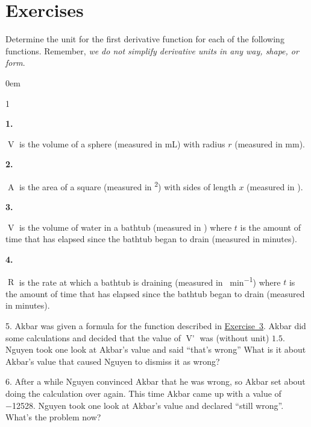 \documentclass[12pt,]{book}
\theoremstyle{plain}
\theoremstyle{definition}
\numberwithin{equation}{section}
\newenvironment{exercisegroup}%
{\medskip\noindent}%
{\par\bigskip}%
\newlength{\exercisegroupindent}%
\newlength{\exercisegroupitemwidth}%
\newenvironment{exercisegrouplist}%
{\vspace{-\partopsep}%
\begin{adjustwidth}{\exercisegroupindent}{0em}}%
{\end{adjustwidth}%
\vspace{-\partopsep}%
\vspace{\baselineskip}}%
\newenvironment{exercisegroupbycol}[1]%
{\begin{exercisegrouplist}%
\vspace{-\multicolsep}%
\begin{multicols}{#1}%
\setlength{\parindent}{0em}%
\setlength{\exercisegroupitemwidth}{\linewidth}}%
{\end{multicols}%
\vspace{-\multicolsep}%
\end{exercisegrouplist}}%
\newenvironment{exercisegroupitem}[1]%
{\begin{minipage}[t]{\exercisegroupitemwidth}
\vspace{0pt}%
{\bfseries#1}%
\rule{0pt}{\baselineskip}}{\strut%
\end{minipage}%
\hspace{\columnsep}}%
\providecommand\phantomsection{}
\newcommand{\fe}[2]{\mathop{{#1}{\left(#2\right)}}}
\newcommand{\fd}[1]{#1'}
\begin{document}
\section*{Exercises}\label{exercises-20}

\begin{exercisegroup}%
Determine the unit for the first derivative function for each of the following functions. Remember, \emph{we do not simplify derivative units in any way, shape, or form}.%
\begin{exercisegroupbycol}{1}%
\begin{exercisegroupitem}{1. }\phantomsection\hypertarget{exercise-137}{\null}
\(\fe{V}{r}\) is the volume of a sphere (measured in \si{\milli\liter}) with radius \(r\) (measured in \si{\milli\meter}).%
\end{exercisegroupitem}%
\par%
\begin{exercisegroupitem}{2. }\phantomsection\hypertarget{exercise-138}{\null}
\(\fe{A}{x}\) is the area of a square (measured in \si{\foot\tothe{2}}) with sides of length \(x\) (measured in \si{\foot}).%
\end{exercisegroupitem}%
\par%
\begin{exercisegroupitem}{3. }\phantomsection\hypertarget{exercise-bathtub}{\null}
\(\fe{V}{t}\) is the volume of water in a bathtub (measured in \si{\gallon}) where \(t\) is the amount of time that has elapsed since the bathtub began to drain (measured in minutes).%
\end{exercisegroupitem}%
\par%
\begin{exercisegroupitem}{4. }\phantomsection\hypertarget{exercise-bathtub-rate}{\null}
\(\fe{R}{t}\) is the rate at which a bathtub is draining (measured in \si{\gallon\per\minute}) where \(t\) is the amount of time that has elapsed since the bathtub began to drain (measured in minutes).%
\end{exercisegroupitem}%
\par%
\end{exercisegroupbycol}%
\end{exercisegroup}%
\begin{exerciselist}
\item[5.]\phantomsection\hypertarget{exercise-141}{\null}Akbar was given a formula for the function described in \hyperref[exercise-bathtub]{Exercise~3}. Akbar did some calculations and decided that the value of \(\fe{\fd{V}}{20}\) was (without unit) \(1.5\). Nguyen took one look at Akbar's value and said ``that's wrong'' What is it about Akbar's value that caused Nguyen to dismiss it as wrong?%
\par\smallskip
\item[6.]\phantomsection\hypertarget{exercise-142}{\null}After a while Nguyen convinced Akbar that he was wrong, so Akbar set about doing the calculation over again. This time Akbar came up with a value of \num{-12528}. Nguyen took one look at Akbar's value and declared ``still wrong''. What's the problem now?%
\par\smallskip
\end{exerciselist}
\end{document}

